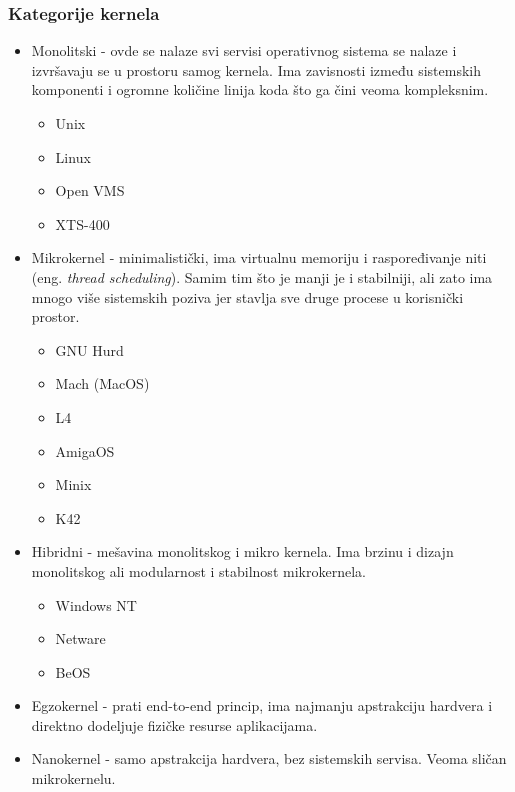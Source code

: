 \documentclass[a4paper,14pt]{article}
\begin{document}
\subsubsection{Kategorije kernela\cite{kernelcats}}
\begin{itemize}
\item Monolitski - ovde se nalaze svi servisi operativnog sistema se nalaze i izvršavaju se u prostoru samog kernela. Ima zavisnosti između sistemskih komponenti i ogromne količine linija koda što ga čini veoma kompleksnim.
\begin{itemize}
\item Unix
\item Linux
\item Open VMS
\item XTS-400
\end{itemize}
\item Mikrokernel - minimalistički, ima virtualnu memoriju i raspoređivanje niti (eng. \textit{thread scheduling}). Samim tim što je manji je i stabilniji, ali zato ima mnogo više sistemskih poziva jer stavlja sve druge procese u korisnički prostor.
\begin{itemize}
\item GNU Hurd
\item Mach (MacOS)
\item L4
\item AmigaOS
\item Minix
\item K42
\end{itemize}
\item Hibridni - mešavina monolitskog i mikro kernela. Ima brzinu i dizajn monolitskog ali modularnost i stabilnost mikrokernela.
\begin{itemize}
\item Windows NT
\item Netware
\item BeOS
\end{itemize}
\item Egzokernel - prati end-to-end princip, ima najmanju apstrakciju hardvera i direktno dodeljuje fizičke resurse aplikacijama.
\item Nanokernel - samo apstrakcija hardvera, bez sistemskih servisa. Veoma sličan mikrokernelu.
\end{itemize}
\newpage
\end{document}
